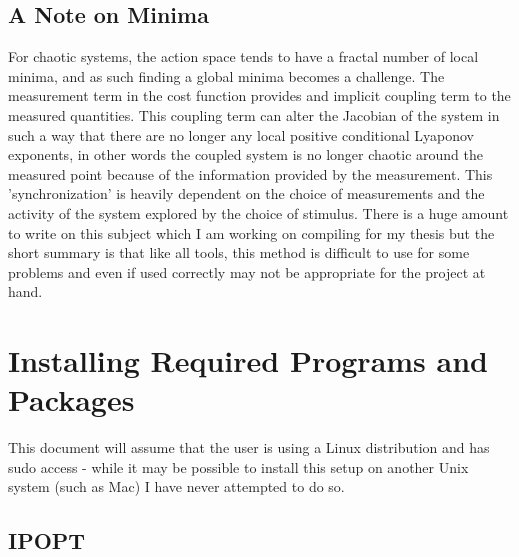 \documentclass{scrartcl}
\begin{document}
\subsection*{A Note on Minima}
For chaotic systems, the action space tends to have a fractal number of local minima, and as such finding a global minima becomes a challenge.  The measurement term in the cost function provides and implicit coupling term to the measured quantities.  This coupling term can alter the Jacobian of the system in such a way that there are no longer any local positive conditional Lyaponov exponents, in other words the coupled system is no longer chaotic around the measured point because of the information provided by the measurement.  This 'synchronization' is heavily dependent on the choice of measurements and the activity of the system explored by the choice of stimulus.  There is a huge amount to write on this subject which I am working on compiling for my thesis but the short summary is that like all tools, this method is difficult to use for some problems and even if used correctly may not be appropriate for the project at hand.


\section*{Installing Required Programs and Packages}
This document will assume that the user is using a Linux distribution and has sudo access - while it may be possible to install this setup on another Unix system (such as Mac) I have never attempted to do so.

\subsection*{IPOPT}
\end{document}
